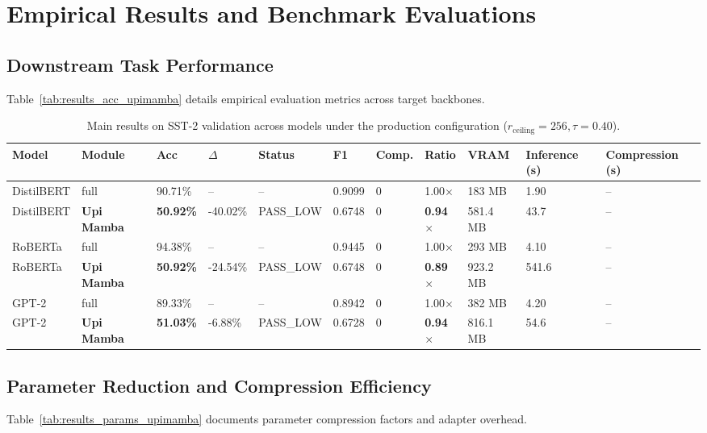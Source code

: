 \section{Empirical Results and Benchmark Evaluations}

\subsection{Downstream Task Performance}
Table~\ref{tab:results_acc_upimamba} details empirical evaluation metrics across target backbones.

\begin{table}[t]
\centering
\small
\begin{tabular}{lllllllllll}
\toprule
\textbf{Model} & \textbf{Module} & \textbf{Acc} & \textbf{$\Delta$} & \textbf{Status} & \textbf{F1} & \textbf{Comp.} & \textbf{Ratio} & \textbf{VRAM} & \textbf{Inference (s)} & \textbf{Compression (s)} \\
\midrule
DistilBERT & full & 90.71\% & -- & -- & 0.9099 & 0 & 1.00$\times$ & 183 MB & 1.90 & -- \\
DistilBERT & \textbf{Upi Mamba} & \textbf{50.92\%} & -40.02\% & PASS_LOW & 0.6748 & 0 & \textbf{0.94$\times$} & 581.4 MB & 43.7 & -- \\
RoBERTa & full & 94.38\% & -- & -- & 0.9445 & 0 & 1.00$\times$ & 293 MB & 4.10 & -- \\
RoBERTa & \textbf{Upi Mamba} & \textbf{50.92\%} & -24.54\% & PASS_LOW & 0.6748 & 0 & \textbf{0.89$\times$} & 923.2 MB & 541.6 & -- \\
GPT-2 & full & 89.33\% & -- & -- & 0.8942 & 0 & 1.00$\times$ & 382 MB & 4.20 & -- \\
GPT-2 & \textbf{Upi Mamba} & \textbf{51.03\%} & -6.88\% & PASS_LOW & 0.6728 & 0 & \textbf{0.94$\times$} & 816.1 MB & 54.6 & -- \\
\bottomrule
\end{tabular}
\caption{Main results on SST-2 validation across models under the production configuration ($r_{\mathrm{ceiling}}=256, \tau=0.40$).}
\label{tab:main_sst2}
\end{table}

\subsection{Parameter Reduction and Compression Efficiency}
Table~\ref{tab:results_params_upimamba} documents parameter compression factors and adapter overhead.

